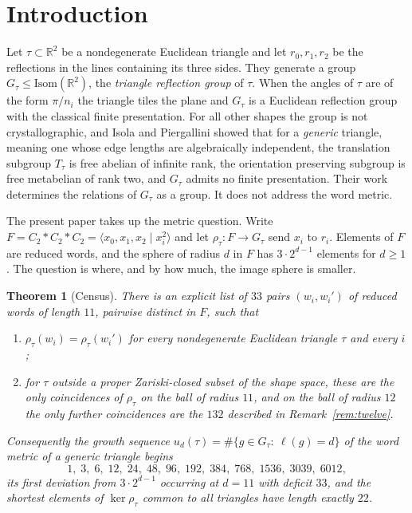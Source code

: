 \documentclass[11pt]{article}
\newtheorem{theorem}{Theorem}[section]
\theoremstyle{definition}
\theoremstyle{remark}
\newcommand{\R}{\mathbb{R}}
\begin{document}
\section{Introduction}\label{sec:intro}

Let $\tau\subset\R^2$ be a nondegenerate Euclidean triangle and let
$r_0,r_1,r_2$ be the reflections in the lines containing its three sides. They
generate a group $G_\tau\le\mathrm{Isom}(\R^2)$, the \emph{triangle reflection
group} of $\tau$. When the angles of $\tau$ are of the form $\pi/n_i$ the
triangle tiles the plane and $G_\tau$ is a Euclidean reflection group with the
classical finite presentation. For all other shapes the group is not
crystallographic, and Isola and Piergallini \cite{IP} showed that for a
\emph{generic} triangle, meaning one whose edge lengths are algebraically
independent, the translation subgroup $T_\tau$ is free abelian of infinite rank,
the orientation preserving subgroup is free metabelian of rank two, and $G_\tau$
admits no finite presentation. Their work determines the relations of $G_\tau$
as a group. It does not address the word metric.

The present paper takes up the metric question. Write
$F=C_2*C_2*C_2=\langle x_0,x_1,x_2\mid x_i^2\rangle$ and let
$\rho_\tau\colon F\to G_\tau$ send $x_i$ to $r_i$. Elements of $F$ are reduced
words, and the sphere of radius $d$ in $F$ has $3\cdot2^{d-1}$ elements for
$d\ge1$. The question is where, and by how much, the image sphere is smaller.

\begin{theorem}[Census]\label{thm:census}
There is an explicit list of $33$ pairs $(w_i,w_i')$ of reduced words of length
$11$, pairwise distinct in $F$, such that
\begin{enumerate}
\item[(i)] $\rho_\tau(w_i)=\rho_\tau(w_i')$ for every nondegenerate Euclidean
triangle $\tau$ and every $i$;
\item[(ii)] for $\tau$ outside a proper Zariski-closed subset of the shape space,
these are the only coincidences of $\rho_\tau$ on the ball of radius $11$, and
on the ball of radius $12$ the only further coincidences are the $132$
described in Remark~\ref{rem:twelve}.
\end{enumerate}
Consequently the growth sequence
$u_d(\tau)=\#\{g\in G_\tau:\ \ell(g)=d\}$ of the word metric of a generic
triangle begins
\[
 1,\;3,\;6,\;12,\;24,\;48,\;96,\;192,\;384,\;768,\;1536,\;3039,\;6012,
\]
its first deviation from $3\cdot2^{d-1}$ occurring at $d=11$ with deficit $33$,
and the shortest elements of $\ker\rho_\tau$ common to all triangles have length
exactly $22$.
\end{theorem}
\end{document}
